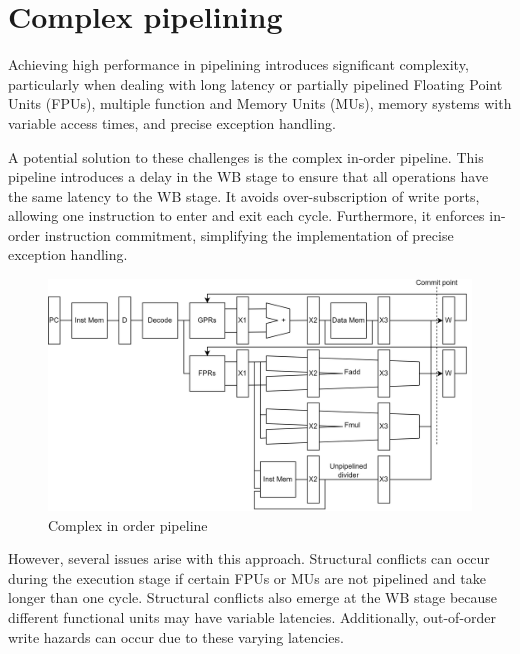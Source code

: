 \section{Complex pipelining}

Achieving high performance in pipelining introduces significant complexity, particularly when dealing with long latency or partially pipelined Floating Point Units (FPUs), multiple function and Memory Units (MUs), memory systems with variable access times, and precise exception handling.

A potential solution to these challenges is the complex in-order pipeline. This pipeline introduces a delay in the WB stage to ensure that all operations have the same latency to the WB stage. It avoids over-subscription of write ports, allowing one instruction to enter and exit each cycle. 
Furthermore, it enforces in-order instruction commitment, simplifying the implementation of precise exception handling.
\begin{figure}[H]
    \centering
    \includegraphics[width=0.5\linewidth]{images/ciop.png}
    \caption{Complex in order pipeline}
\end{figure}
However, several issues arise with this approach. 
Structural conflicts can occur during the execution stage if certain FPUs or MUs are not pipelined and take longer than one cycle. 
Structural conflicts also emerge at the WB stage because different functional units may have variable latencies. 
Additionally, out-of-order write hazards can occur due to these varying latencies.